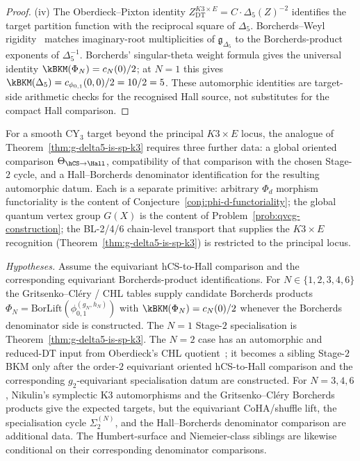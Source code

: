\begin{proof}
(iv) The Oberdieck--Pixton identity $Z^{K3 \times E}_{\mathrm{DT}} = C \cdot \Delta_5(Z)^{-2}$ identifies the target partition function with the reciprocal square of $\Delta_5$. Borcherds--Weyl rigidity~\cite{Borcherds1998} matches imaginary-root multiplicities of $\mathfrak{g}_{\Delta_5}$ to the Borcherds-product exponents of $\Delta_5^{-1}$. Borcherds' singular-theta weight formula gives the universal identity $\kBKM(\Phi_N)=c_N(0)/2$; at $N=1$ this gives $\kBKM(\Delta_5)=c_{\phi_{0,1}}(0,0)/2=10/2=5$. These automorphic identities are target-side arithmetic checks for the recognised Hall source, not substitutes for the compact Hall comparison.
\end{proof}

\begin{conjecture}
\label{conj:g-delta5-is-sp-k3-general-extension}
\ClaimStatusConjectured
For a smooth CY$_3$ target beyond the principal $K3\times E$ locus, the analogue of Theorem~\ref{thm:g-delta5-is-sp-k3} requires three further data: a global oriented comparison $\Theta_{\hCS\to\Hall}$, compatibility of that comparison with the chosen Stage-$2$ cycle, and a Hall--Borcherds denominator identification for the resulting automorphic datum. Each is a separate primitive: arbitrary $\Phi_d$ morphism functoriality is the content of Conjecture~\ref{conj:phi-d-functoriality}; the global quantum vertex group $G(X)$ is the content of Problem~\ref{prob:qvcg-construction}; the BL-2/4/6 chain-level transport that supplies the $K3 \times E$ recognition (Theorem~\ref{thm:g-delta5-is-sp-k3}) is restricted to the principal locus.
\end{conjecture}

\begin{corollary}
\label{cor:sibling-BKMs-from-one-phiFA}
\noindent\emph{Hypotheses.} Assume the equivariant hCS-to-Hall comparison and the corresponding equivariant Borcherds-product identifications.
For $N \in \{1, 2, 3, 4, 6\}$ the Gritsenko--Cl\'ery / CHL tables supply candidate Borcherds products $\Phi_N = \mathrm{BorLift}(\phi_{0,1}^{(g_N, h_N)})$ with $\kBKM(\Phi_N) = c_N(0)/2$ whenever the Borcherds denominator side is constructed. The $N = 1$ Stage-$2$ specialisation is Theorem~\ref{thm:g-delta5-is-sp-k3}. The $N = 2$ case has an automorphic and reduced-DT input from Oberdieck's CHL quotient~\cite{Oberdieck2017}; it becomes a sibling Stage-$2$ BKM only after the order-$2$ equivariant oriented hCS-to-Hall comparison and the corresponding $g_2$-equivariant specialisation datum are constructed. For $N = 3, 4, 6$, Nikulin's symplectic K3 automorphisms and the Gritsenko--Cl\'ery Borcherds products give the expected targets, but the equivariant CoHA/shuffle lift, the specialisation cycle $\Sigma_2^{(N)}$, and the Hall--Borcherds denominator comparison are additional data. The Humbert-surface and Niemeier-class siblings are likewise conditional on their corresponding denominator comparisons.
\end{corollary}

